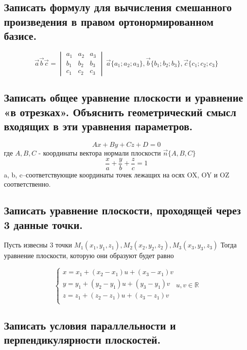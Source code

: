 \documentclass[a4paper, 10pt]{article}
\renewcommand{\a}{\vec{a}}
\renewcommand{\b}{\vec{b}}
\renewcommand{\c}{\vec{c}}
\newcommand{\image}[2]{
	\begin{figure}[H]
		\center{\texttt{[image: img/\#1]} }
    \end{figure}
}
\begin{document}
\subsection{Записать формулу для вычисления смешанного произведения в правом ортонормированном базисе.}

$$\a\b\c = 
\begin{vmatrix}
    a_1 & a_2 & a_3\\
    b_1 & b_2 & b_3\\
    c_1 & c_2 & c_3
\end{vmatrix} \ \a\{a_1;a_2;a_3\},
\b\{b_1;b_2;b_3\}, \c\{c_1;c_2;c_3\}$$

\subsection{Записать общее уравнение плоскости и уравнение «в отрезках». Объяснить 
геометрический смысл входящих в эти уравнения параметров.}

$$Ax + By + Cz + D = 0$$где $A, B, C$ - координаты вектора нормали плоскости $\vec{n}\{A, B, C\}$
$$\frac{x}{a}+\frac{y}{b}+\frac{z}{c} = 1$$a, b, c–соответствующие координаты точек 
лежащих на осях OX, OY и OZ соответственно.

\image{4.png}{200}


\subsection{Записать уравнение плоскости, проходящей через 3 данные точки.}
Пусть извесны 3 точки $M_1(x_1,y_1,z_1),M_2(x_2,y_2,z_2),M_3(x_3,y_3,z_3)$
Тогда уравнение плоскости, которую они образуют будет равно 


$$
 \begin{cases}
   x = x_1+(x_2-x_1)u+(x_3-x_1)v\\
   y = y_1+(y_2-y_1)u+(y_3-y_1)v\\
   z = z_1+(z_2-z_1)u+(z_3-z_1)v\\
 \end{cases}
 u,v \in \mathbb{R}
$$

\subsection{Записать условия параллельности и перпендикулярности плоскостей.}
\end{document}
